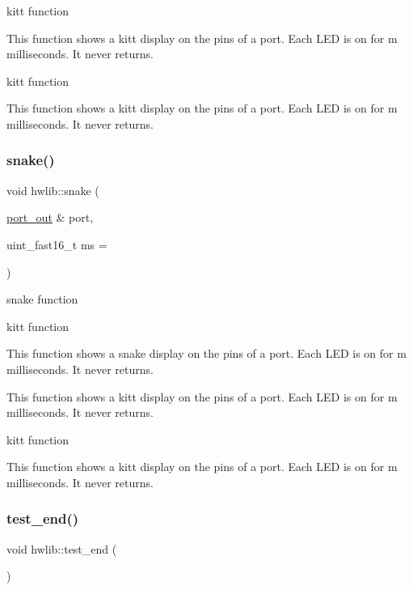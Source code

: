 kitt function 

This function shows a kitt display on the pins of a port. Each L\+ED is on for m milliseconds. It never returns.

kitt function

This function shows a kitt display on the pins of a port. Each L\+ED is on for m milliseconds. It never returns. \mbox{\label{namespacehwlib_ade8d1e7034d2491a2180116619ec4fbe}} 
\subsubsection{\texorpdfstring{snake()}{snake()}\hspace{0.1cm}{\footnotesize\ttfamily [3/3]}}
{\footnotesize\ttfamily void hwlib\+::snake (\begin{DoxyParamCaption}\item[{\hyperlink{classhwlib_1_1port__out}{port\+\_\+out} \&}]{port,  }\item[{uint\+\_\+fast16\+\_\+t}]{ms = {} }\end{DoxyParamCaption})}



snake function 

kitt function

This function shows a snake display on the pins of a port. Each L\+ED is on for m milliseconds. It never returns.

This function shows a kitt display on the pins of a port. Each L\+ED is on for m milliseconds. It never returns.

kitt function

This function shows a kitt display on the pins of a port. Each L\+ED is on for m milliseconds. It never returns. \mbox{\label{namespacehwlib_af30c15244b6a508f320f01317dc84d7f}} 
\subsubsection{\texorpdfstring{test\+\_\+end()}{test\_end()}}
{\footnotesize\ttfamily void hwlib\+::test\+\_\+end (\begin{DoxyParamCaption}{ }\end{DoxyParamCaption})}



